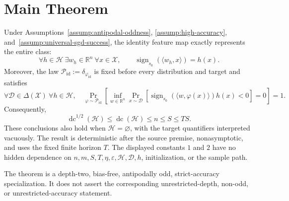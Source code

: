 \section{Main Theorem}
\label{sec:main-theorem}

\begin{theorem}
\label{thm:main}
Under Assumptions~\ref{assump:antipodal-oddness},
\ref{assump:high-accuracy}, and~\ref{assump:universal-sgd-success}, the
identity feature map exactly represents the entire class:
\[
\forall h\in\mathcal H\ \exists w_h\in\mathbb R^n\ \forall x\in\mathcal X,
\qquad
\operatorname{sign}_{s_0}(\langle w_h,x\rangle)=h(x).
\]
Moreover, the law
$\mathcal P_{\mathrm{id}}:=\delta_{\varphi_{\mathrm{id}}}$ is fixed before
every distribution and target and satisfies
\[
\forall\mathcal D\in\Delta(\mathcal X)\ \forall h\in\mathcal H,
\quad
\Pr_{\varphi\sim\mathcal P_{\mathrm{id}}}\!\left[
\inf_{w\in\mathbb R^n}
\Pr_{x\sim\mathcal D}\!\left[
\operatorname{sign}_{s_0}(\langle w,\varphi(x)\rangle)h(x)<0
\right]=0\right]=1.
\]
Consequently,
\[
\operatorname{dc}^{1/2}(\mathcal H)
\leq\operatorname{dc}(\mathcal H)\leq n\leq S\leq TS.
\]
These conclusions also hold when $\mathcal H=\varnothing$, with the target
quantifiers interpreted vacuously.  The result is deterministic after the
source premise, nonasymptotic, and uses the fixed finite horizon $T$.  The
displayed constants $1$ and $2$ have no hidden dependence on
$n,m,S,T,\eta,\varepsilon,\mathcal H,\mathcal D,h$, initialization, or the
sample path.
\end{theorem}

The theorem is a depth-two, bias-free, antipodally odd, strict-accuracy
specialization.  It does not assert the corresponding unrestricted-depth,
non-odd, or unrestricted-accuracy statement.
